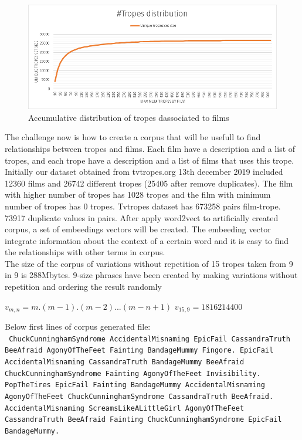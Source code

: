 \documentclass[letterpaper]{article}
\begin{document}
	\begin{figure}
		\centering
		\includegraphics[width=0.9\linewidth]{../images/tropes_distribution_chart.png}
		\caption{Accumulative distribution of tropes dassociated to films}
		\label{fig:tropesdistributionasociatedtofilms}
	\end{figure}
	 
	The challenge now is how to create a corpus that will be usefull to find relationships between tropes and films. Each film have a description and a list of tropes, and each trope have a description and a list of films that uses this trope. Initially our dataset obtained from tvtropes.org 13th december 2019 included 12360 films and 26742 different tropes (25405 after remove duplicates). The film with higher number of tropes has 1028 tropes and the film with minimum number of tropes has 0 tropes. Tvtropes dataset has 673258 pairs film-trope. 73917 duplicate values in pairs. After apply word2vect to artificially created corpus, a set of embeedings vectors will be created. The embeeding vector integrate information about the context of a certain word and it is easy to find the relationships with other terms in corpus.\\
	
    The size of the corpus of variations without repetition of 15 tropes taken from 9 in 9 is 288Mbytes. 9-size phrases have been created by making variations without repetition and ordering the result randomly \\
	
	\begin{center}

${v}_{m,n} = m.(m-1).(m-2)...(m-n+1)$
${v}_{15,9} = 1816214400$
	
    \end{center}
	
	Below first lines of corpus generated file:\\
	\texttt{    
	ChuckCunninghamSyndrome AccidentalMisnaming EpicFail CassandraTruth BeeAfraid AgonyOfTheFeet Fainting BandageMummy Fingore. EpicFail AccidentalMisnaming CassandraTruth BandageMummy BeeAfraid ChuckCunninghamSyndrome Fainting AgonyOfTheFeet Invisibility. PopTheTires EpicFail Fainting BandageMummy AccidentalMisnaming AgonyOfTheFeet ChuckCunninghamSyndrome CassandraTruth BeeAfraid. AccidentalMisnaming ScreamsLikeALittleGirl AgonyOfTheFeet CassandraTruth BeeAfraid Fainting ChuckCunninghamSyndrome EpicFail BandageMummy.}\\
\end{document}
